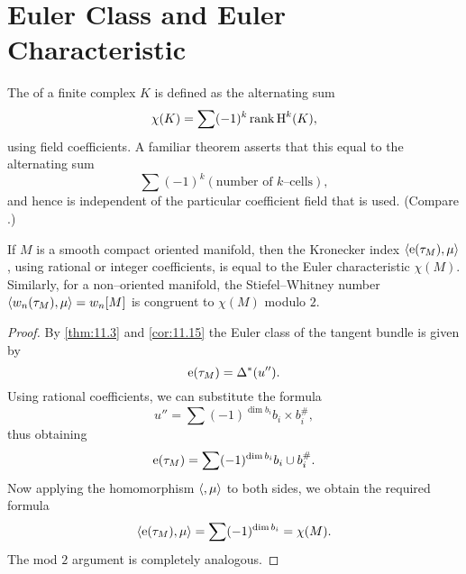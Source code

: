 \documentclass[../main]{subfiles}
\begin{document}
\section{Euler Class and Euler Characteristic}\label{sec:11.5}
The  of a finite complex $K$ is defined as the alternating sum \[\chi(K) = \sum (-1)^k \operatorname{rank} \operatorname{H}^k(K),\] using field coefficients. A familiar theorem asserts that this equal to the alternating sum \[\sum (-1)^k (\text{number of } k\text{--cells}),\] and hence is independent of the particular coefficient field that is used. (Compare \cite[pp. 105,106]{dold1972}.)

\begin{corollary}\label{cor:11.12}
If $M$ is a smooth compact oriented manifold, then the Kronecker index $\langle\operatorname{e}(\tau_{M}),\mu\rangle$, using rational or integer coefficients, is equal to the Euler characteristic $\chi(M)$. Similarly, for a non--oriented manifold, the Stiefel--Whitney number $\langle w_n(\tau_{M}),\mu\rangle = w_n[M]$ is congruent to $\chi(M)$ modulo $2$. 
\end{corollary}

\begin{proof}
By \ref{thm:11.3} and \ref{cor:11.15} the Euler class of the tangent bundle is given by \[\operatorname{e}(\tau_{M}) = \Delta^\ast (u'').\] Using rational coefficients, we can substitute the formula \[u'' = \sum (-1)^{\dim b_i} b_i \times b_i^\#,\] thus obtaining \[\operatorname{e}(\tau_{M}) = \sum (-1)^{\dim b_i} b_i \cup b_i^\#.\] Now applying the homomorphism $\langle,\mu\rangle$ to both sides, we obtain the required formula \[\langle\operatorname{e}(\tau_{M}),\mu\rangle = \sum (-1)^{\dim b_i} = \chi(M).\] The mod $2$ argument is completely analogous.
\end{proof}
\end{document}
